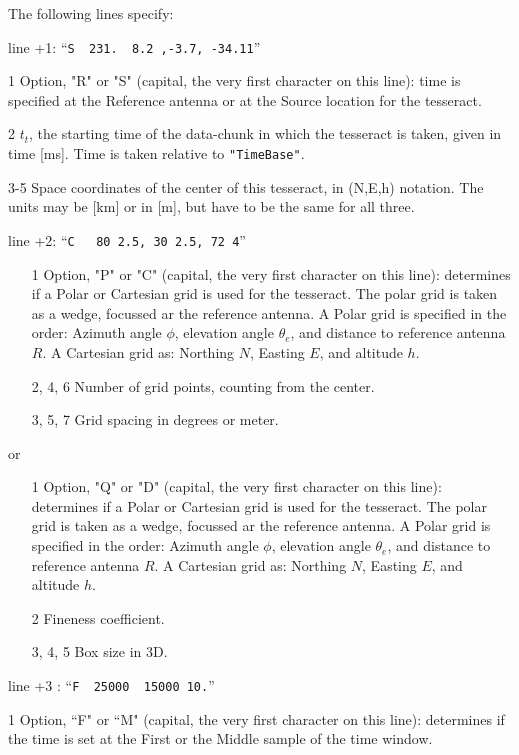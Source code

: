 The following lines specify:
\begin{enumerate*}
\item[line +1:]   ``\verb#S  231.  8.2 ,-3.7, -34.11#''
   \begin{enumerate*}
   \item[1] Option, "R" or "S" (capital, the very first character on this line): time is specified at the Reference antenna or at the Source location for the tesseract.
   \item[2] $t_t$, the starting time of the data-chunk in which the tesseract is taken, given in time [ms]. Time is taken relative to \verb!"TimeBase"!.
   \item[3-5] Space coordinates of the center of this tesseract, in (N,E,h) notation. The units may be [km] or in [m], but have to be the same for all three.
   \end{enumerate*}
\item[line +2:]   ``\verb#C   80 2.5, 30 2.5, 72 4#''
   \begin{enumerate}
   \item[1] Option, "P" or "C" (capital, the very first character on this line): determines if a Polar or Cartesian grid is used for the tesseract. The polar grid is taken as a wedge, focussed ar the reference antenna. A Polar grid is specified in the order: Azimuth angle $\phi$, elevation angle $\theta_e$, and distance to reference antenna $R$. A Cartesian grid as: Northing $N$, Easting $E$, and altitude $h$.
   \item[2, 4, 6] Number of grid points, counting from the center.
   \item[3, 5, 7] Grid spacing in degrees or meter.
   \end{enumerate}
   or
   \begin{enumerate}
   \item[1] Option, "Q" or "D" (capital, the very first character on this line): determines if a Polar or Cartesian grid is used for the tesseract. The polar grid is taken as a wedge, focussed ar the reference antenna. A Polar grid is specified in the order: Azimuth angle $\phi$, elevation angle $\theta_e$, and distance to reference antenna $R$. A Cartesian grid as: Northing $N$, Easting $E$, and altitude $h$.
   \item[2] Fineness coefficient.
   \item[3, 4, 5] Box size in 3D.
   \end{enumerate}
\item[line +3]:   ``\verb#F  25000  15000 10.#''
   \item[1] Option, ``F" or ``M" (capital, the very first character on this line): determines if the time is set at the First or the Middle sample of the time window.

\end{enumerate*}
